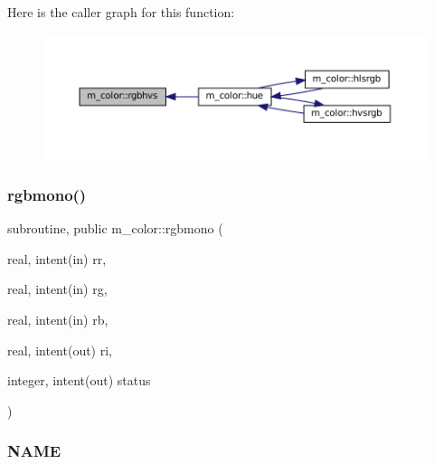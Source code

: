 \begin{DoxyDescription}
\begin{DoxyPre}
\begin{DoxyPre} \end{DoxyPre}
\end{DoxyPre}



\begin{DoxyPre}
\begin{DoxyPre} \end{DoxyPre}
\end{DoxyPre}

\end{DoxyDescription}Here is the caller graph for this function\+:
\nopagebreak
\begin{figure}[H]
\begin{center}
\leavevmode
\includegraphics[width=350pt]{namespacem__color_a76f00e1d418c4904a963094bc730a0e6_icgraph}
\end{center}
\end{figure}
\mbox{\label{namespacem__color_aca19999686fc20d79da580c6a643dc35}} 
\subsubsection{\texorpdfstring{rgbmono()}{rgbmono()}}
{\footnotesize\ttfamily subroutine, public m\+\_\+color\+::rgbmono (\begin{DoxyParamCaption}\item[{real, intent(in)}]{rr,  }\item[{real, intent(in)}]{rg,  }\item[{real, intent(in)}]{rb,  }\item[{real, intent(out)}]{ri,  }\item[{integer, intent(out)}]{status }\end{DoxyParamCaption})}



\subsubsection*{N\+A\+ME}


